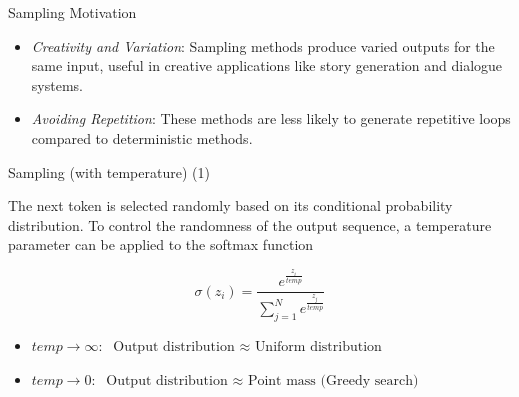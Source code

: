 \documentclass[11pt,compress,t,notes=noshow, xcolor=table]{beamer}
\begin{document}


\begin{vbframe}{Sampling Motivation}

\vfill
    
\begin{itemize}
    \item \textit{Creativity and Variation}: Sampling methods produce varied outputs for the same input, useful in creative applications like story generation and dialogue systems.
    \item \textit{Avoiding Repetition}: These methods are less likely to generate repetitive loops compared to deterministic methods.
\end{itemize}

\vfill

\end{vbframe}


\begin{vbframe}{Sampling (with temperature) (1)}



The next token is selected randomly based on its conditional probability distribution. To control the randomness of the output sequence, a temperature parameter can be applied to the softmax function

\vfill 

$$
\sigma\left(z_i\right)=\frac{e^{\frac{z_i}{temp}}}{\sum_{j=1}^N e^{\frac{z_j}{temp}}}
$$

\vfill

\begin{itemize}
\item $temp \rightarrow \infty: \text{ Output distribution $\approx$ Uniform distribution}$
\item $temp \rightarrow 0: \text{ Output distribution $\approx$ Point mass (Greedy search) }$
\end{itemize}



\end{vbframe}
\end{document}
